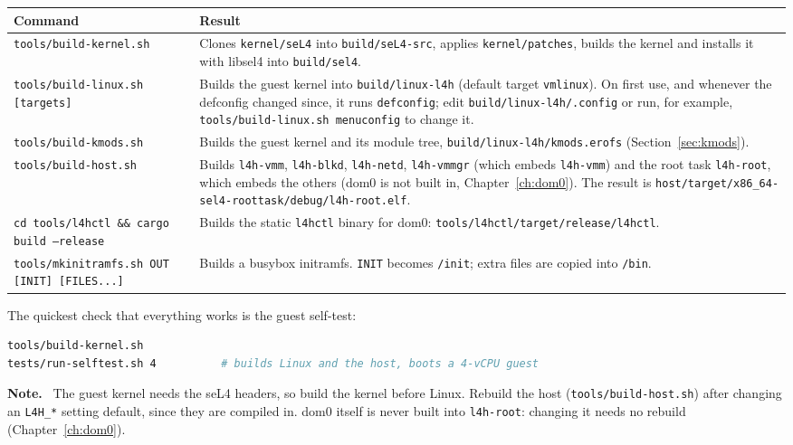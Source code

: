 \documentclass[11pt,a4paper]{report}
\newcommand{\cmd}[1]{\texttt{#1}}
\newcommand{\file}[1]{\texttt{#1}}
\newenvironment{caveat}{\par\medskip\noindent\color{note}\textbf{Note.}\ }{\par\medskip}
\begin{document}
\begin{longtable}{@{}p{5.2cm}p{9.3cm}@{}}
\toprule
Command & Result \\
\midrule
\endhead
\cmd{tools/build-kernel.sh} & Clones \file{kernel/seL4} into
  \file{build/seL4-src}, applies \file{kernel/patches}, builds the kernel and
  installs it with libsel4 into \file{build/sel4}. \\
\cmd{tools/build-linux.sh [targets]} & Builds the guest kernel into
  \file{build/linux-l4h} (default target \texttt{vmlinux}). On first use, and
  whenever the defconfig changed since, it runs \texttt{defconfig}; edit
  \file{build/linux-l4h/.config} or run, for example,
  \cmd{tools/build-linux.sh menuconfig} to change it. \\
\cmd{tools/build-kmods.sh} & Builds the guest kernel and its module tree,
  \file{build/linux-l4h/kmods.erofs} (Section~\ref{sec:kmods}). \\
\cmd{tools/build-host.sh} & Builds \texttt{l4h-vmm}, \texttt{l4h-blkd},
  \texttt{l4h-netd}, \texttt{l4h-vmmgr} (which embeds \texttt{l4h-vmm}) and
  the root task \texttt{l4h-root}, which embeds the others
  (dom0 is not built in, Chapter~\ref{ch:dom0}). The result is
  \file{host/target/\allowbreak x86\_64-sel4-roottask/\allowbreak debug/\allowbreak l4h-root.elf}. \\
\cmd{cd tools/l4hctl \&\& cargo build --release} & Builds the static
  \cmd{l4hctl} binary for dom0:
  \file{tools/l4hctl/target/release/l4hctl}. \\
\cmd{tools/mkinitramfs.sh OUT [INIT] [FILES...]} & Builds a busybox
  initramfs. \texttt{INIT} becomes \file{/init}; extra files are copied
  into \file{/bin}. \\
\bottomrule
\end{longtable}

The quickest check that everything works is the guest self-test:
\begin{lstlisting}[language=bash]
tools/build-kernel.sh
tests/run-selftest.sh 4          # builds Linux and the host, boots a 4-vCPU guest
\end{lstlisting}

\begin{caveat}
The guest kernel needs the seL4 headers, so build the kernel before Linux.
Rebuild the host (\cmd{tools/build-host.sh}) after changing an
\texttt{L4H\_*} setting default, since they are compiled in. dom0 itself is
never built into \texttt{l4h-root}: changing it needs no rebuild
(Chapter~\ref{ch:dom0}).
\end{caveat}
\end{document}
